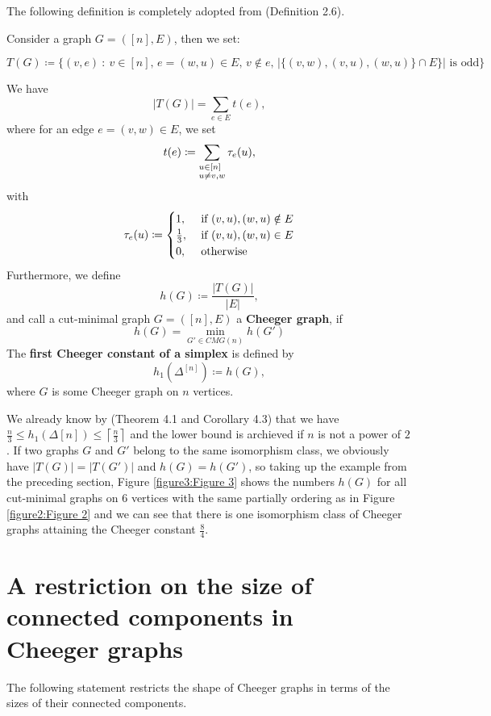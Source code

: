 The following definition is completely adopted from \cite{1} (Definition 2.6).
\begin{defi}\label{definition1}
Consider a graph \(G=([n],E)\), then we set:
\begin{small}
\[
T(G)\coloneqq \{(v,e)\: :\: v\in [n]\text{, }e=(w,u)\in E\text{, }v\notin e\text{, }|\{(v,w),(v,u),(w,u)\}\cap E\}|\text{ is odd}\}
\]
\end{small}
We have
\[
|T(G)|=\sum\limits_{e\in E}t(e),
\]
where for an edge \(e=(v,w)\in E\), we set
\[
t(e)\coloneqq \sum\limits_{\begin{subarray}{l}u\in[n]\\ u\neq v,w\end{subarray}}\tau_e(u),
\]
with
\begin{equation}
\tau_e(u)\coloneqq 
\begin{cases}
1,&\text{ if }(v,u),(w,u)\notin E\notag\\
\frac{1}{3},&\text{ if }(v,u),(w,u)\in E\notag\\
0,&\text{ otherwise}\notag
\end{cases}
\end{equation}
Furthermore, we define
\[
h(G)\coloneqq \frac{|T(G)|}{|E|},
\]
and call a cut-minimal graph \(G=([n],E)\) a \textbf{Cheeger graph}, if
\[
h(G)=\min\limits_{G'\in CMG(n)}h(G')
\]
The \textbf{first Cheeger constant of a simplex} is defined by
\[
h_1(\Delta^{[n]})\coloneqq h(G),
\]
where \(G\) is some Cheeger graph on \(n\) vertices.
\end{defi}
We already know by \cite{1} (Theorem 4.1 and Corollary 4.3) that we have \(\frac{n}{3}\leq h_1(\Delta{[n]})\leq\left\lceil\frac{n}{3}\right\rceil\) and the lower bound is archieved if \(n\) is not a power of \(2\). If two graphs \(G\) and \(G'\) belong to the same isomorphism class, we obviously have \(|T(G)|=|T(G')|\) and \(h(G)=h(G')\), so taking up the example from the preceding section, Figure \ref{figure3:Figure 3} shows the numbers \(h(G)\) for all cut-minimal graphs on \(6\) vertices with the same partially ordering as in Figure \ref{figure2:Figure 2} and we can see that there is one isomorphism class of Cheeger graphs attaining the Cheeger constant \(\frac{8}{4}\).



\section{A restriction on the size of connected components in\\ Cheeger graphs}
The following statement restricts the shape of Cheeger graphs in terms of the sizes of their connected components.

